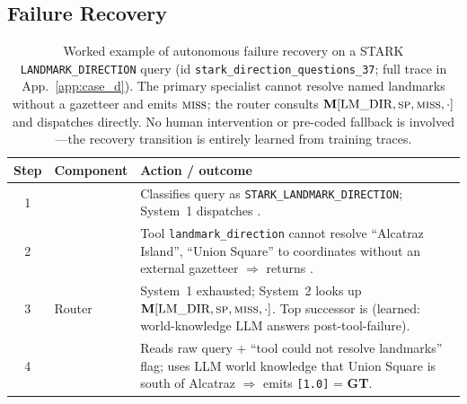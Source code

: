 \subsection{Failure Recovery}
\label{sec:recovery}

\begin{table}[!htbp]
\centering
\caption{Worked example of autonomous failure recovery on a STARK \texttt{LANDMARK\_DIRECTION} query (id \texttt{stark\_direction\_questions\_37}; full trace in App.~\ref{app:case_d}).  The primary specialist cannot resolve named landmarks without a gazetteer and emits $\textnormal{\textsc{miss}}$; the router consults $\mathbf{M}[\text{LM\_DIR}, \textnormal{\textsc{sp}}, \textnormal{\textsc{miss}}, \cdot]$ and dispatches \sfuse{} directly.  No human intervention or pre-coded fallback is involved---the recovery transition is entirely learned from training traces.}
\label{tab:recovery_example}
\small
\setlength{\tabcolsep}{4pt}
\begin{tabular}{c l p{8.7cm}}
\toprule
Step & Component & Action / outcome \\
\midrule
1 & \shead{}    & Classifies query as \texttt{STARK\_LANDMARK\_DIRECTION}; System~1 dispatches \ssp{}. \\
2 & \ssp{}      & Tool \texttt{landmark\_direction} cannot resolve ``Alcatraz Island'', ``Union Square'' to coordinates without an external gazetteer $\Rightarrow$ returns \smiss{}. \\
3 & Router      & System~1 exhausted; System~2 looks up $\mathbf{M}[\text{LM\_DIR}, \textnormal{\textsc{sp}}, \textnormal{\textsc{miss}}, \cdot]$.  Top successor is \sfuse{} (learned: world-knowledge LLM answers post-tool-failure). \\
4 & \sfuse{}    & Reads raw query + ``tool could not resolve landmarks'' flag; uses LLM world knowledge that Union Square is south of Alcatraz $\Rightarrow$ emits \texttt{[1.0]} = \textbf{GT}. \\
\bottomrule
\end{tabular}
\end{table}

